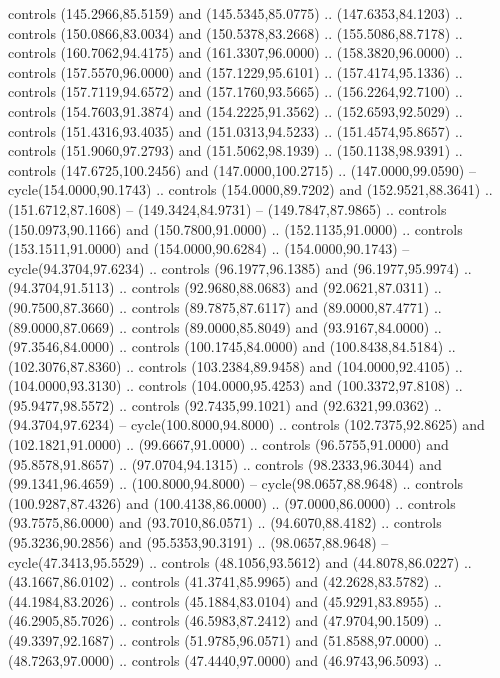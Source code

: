   controls (145.2966,85.5159) and (145.5345,85.0775) .. (147.6353,84.1203) ..
  controls (150.0866,83.0034) and (150.5378,83.2668) .. (155.5086,88.7178) ..
  controls (160.7062,94.4175) and (161.3307,96.0000) .. (158.3820,96.0000) ..
  controls (157.5570,96.0000) and (157.1229,95.6101) .. (157.4174,95.1336) ..
  controls (157.7119,94.6572) and (157.1760,93.5665) .. (156.2264,92.7100) ..
  controls (154.7603,91.3874) and (154.2225,91.3562) .. (152.6593,92.5029) ..
  controls (151.4316,93.4035) and (151.0313,94.5233) .. (151.4574,95.8657) ..
  controls (151.9060,97.2793) and (151.5062,98.1939) .. (150.1138,98.9391) ..
  controls (147.6725,100.2456) and (147.0000,100.2715) .. (147.0000,99.0590) --
  cycle(154.0000,90.1743) .. controls (154.0000,89.7202) and (152.9521,88.3641)
  .. (151.6712,87.1608) -- (149.3424,84.9731) -- (149.7847,87.9865) .. controls
  (150.0973,90.1166) and (150.7800,91.0000) .. (152.1135,91.0000) .. controls
  (153.1511,91.0000) and (154.0000,90.6284) .. (154.0000,90.1743) --
  cycle(94.3704,97.6234) .. controls (96.1977,96.1385) and (96.1977,95.9974) ..
  (94.3704,91.5113) .. controls (92.9680,88.0683) and (92.0621,87.0311) ..
  (90.7500,87.3660) .. controls (89.7875,87.6117) and (89.0000,87.4771) ..
  (89.0000,87.0669) .. controls (89.0000,85.8049) and (93.9167,84.0000) ..
  (97.3546,84.0000) .. controls (100.1745,84.0000) and (100.8438,84.5184) ..
  (102.3076,87.8360) .. controls (103.2384,89.9458) and (104.0000,92.4105) ..
  (104.0000,93.3130) .. controls (104.0000,95.4253) and (100.3372,97.8108) ..
  (95.9477,98.5572) .. controls (92.7435,99.1021) and (92.6321,99.0362) ..
  (94.3704,97.6234) -- cycle(100.8000,94.8000) .. controls (102.7375,92.8625)
  and (102.1821,91.0000) .. (99.6667,91.0000) .. controls (96.5755,91.0000) and
  (95.8578,91.8657) .. (97.0704,94.1315) .. controls (98.2333,96.3044) and
  (99.1341,96.4659) .. (100.8000,94.8000) -- cycle(98.0657,88.9648) .. controls
  (100.9287,87.4326) and (100.4138,86.0000) .. (97.0000,86.0000) .. controls
  (93.7575,86.0000) and (93.7010,86.0571) .. (94.6070,88.4182) .. controls
  (95.3236,90.2856) and (95.5353,90.3191) .. (98.0657,88.9648) --
  cycle(47.3413,95.5529) .. controls (48.1056,93.5612) and (44.8078,86.0227) ..
  (43.1667,86.0102) .. controls (41.3741,85.9965) and (42.2628,83.5782) ..
  (44.1984,83.2026) .. controls (45.1884,83.0104) and (45.9291,83.8955) ..
  (46.2905,85.7026) .. controls (46.5983,87.2412) and (47.9704,90.1509) ..
  (49.3397,92.1687) .. controls (51.9785,96.0571) and (51.8588,97.0000) ..
  (48.7263,97.0000) .. controls (47.4440,97.0000) and (46.9743,96.5093) ..
